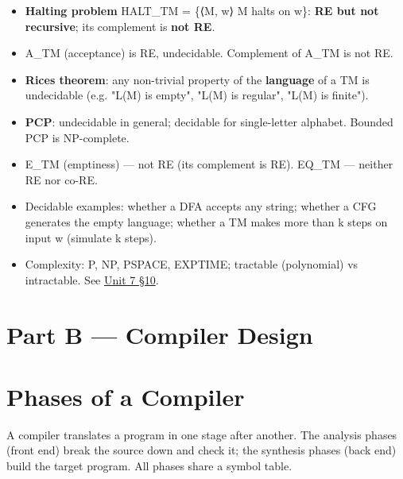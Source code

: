 \begin{itemize}
\tightlist
\item
  \textbf{Halting problem} HALT\_TM = \{⟨M, w⟩ \textbar{} M halts on w\}: \textbf{RE but not recursive}; its complement is \textbf{not RE}.
\item
  A\_TM (acceptance) is RE, undecidable. Complement of A\_TM is not RE.
\item
  \textbf{Rice\textquotesingle s theorem}: any non-trivial property of the \textbf{language} of a TM is undecidable (e.g. "L(M) is empty", "L(M) is regular", "L(M) is finite").
\item
  \textbf{PCP}: undecidable in general; decidable for single-letter alphabet. Bounded PCP is NP-complete.
\item
  E\_TM (emptiness) --- not RE (its complement is RE). EQ\_TM --- neither RE nor co-RE.
\item
  Decidable examples: whether a DFA accepts any string; whether a CFG generates the empty language; whether a TM makes more than k steps on input w (simulate k steps).
\item
  Complexity: P, NP, PSPACE, EXPTIME; tractable (polynomial) vs intractable. See \protect\hyperlink{p2-07--10-complexity-classes}{Unit 7 §10}.
\end{itemize}

\needspace{161pt}

\hypertarget{p2-08--part-b--compiler-design}{%
\section{Part B --- Compiler Design}\label{p2-08--part-b--compiler-design}}

\needspace{125pt}

\hypertarget{p2-08--9-phases-of-a-compiler}{%
\section{Phases of a Compiler}\label{p2-08--9-phases-of-a-compiler}}

A compiler translates a program in one stage after another. The analysis phases (front end) break the source
down and check it; the synthesis phases (back end) build the target program. All phases share a symbol table.



